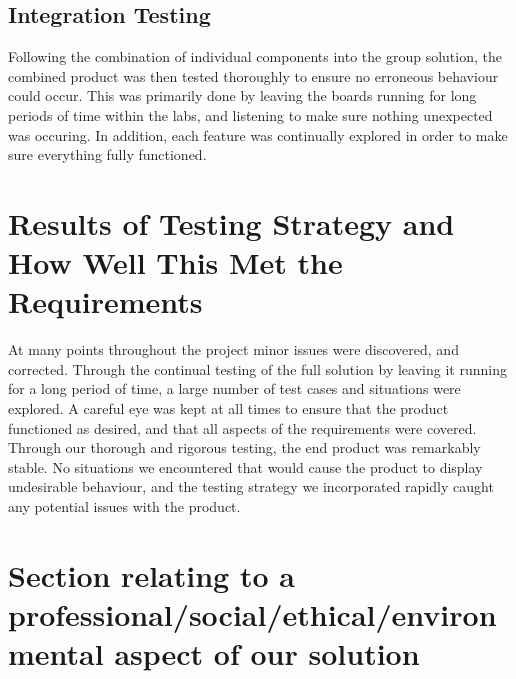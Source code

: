 \subsection*{Integration Testing}

Following the combination of individual components into the group solution, the 
combined product was then tested thoroughly to ensure no erroneous behaviour 
could occur. This was primarily done by leaving the boards running for long 
periods of time within the labs, and listening to make sure nothing unexpected 
was occuring. In addition, each feature was continually explored in order to 
make sure everything fully functioned.  

\section{Results of Testing Strategy and How Well This Met the Requirements}

At many points throughout the project minor issues were discovered, and corrected. 
Through the continual testing of the full solution by leaving it running for a 
long period of time, a large number of test cases and situations were explored.
A careful eye was kept at all times to ensure that the product functioned as 
desired, and that all aspects of the requirements were covered. Through our 
thorough and rigorous testing, the end product was remarkably stable. 
No situations we encountered that would cause the product to display undesirable 
behaviour, and the testing strategy we incorporated rapidly caught any potential 
issues with the product. 

\section{Section relating to a professional/social/ethical/environmental
        aspect of our solution} %
